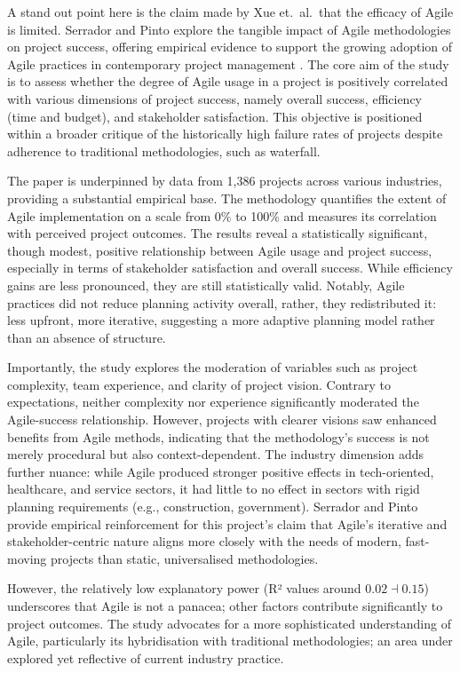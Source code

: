 \documentclass{report}
\begin{document}
A stand out point here is the claim made by Xue et.\ al.\ that the efficacy of Agile is limited. 
Serrador and Pinto explore the tangible impact of Agile methodologies on project success, offering empirical evidence to support the growing adoption of Agile practices in contemporary project management \parencite{serradorDoesAgileWork2015}. 
The core aim of the study is to assess whether the degree of Agile usage in a project is positively correlated with various dimensions of project success, namely overall success, efficiency (time and budget), and stakeholder satisfaction. 
This objective is positioned within a broader critique of the historically high failure rates of projects despite adherence to traditional methodologies, such as waterfall.

The paper is underpinned by data from 1,386 projects across various industries, providing a substantial empirical base. 
The methodology quantifies the extent of Agile implementation on a scale from 0\% to 100\% and measures its correlation with perceived project outcomes. 
The results reveal a statistically significant, though modest, positive relationship between Agile usage and project success, especially in terms of stakeholder satisfaction and overall success. 
While efficiency gains are less pronounced, they are still statistically valid. Notably, Agile practices did not reduce planning activity overall, rather, they redistributed it: less upfront, more iterative, suggesting a more adaptive planning model rather than an absence of structure.

Importantly, the study explores the moderation of variables such as project complexity, team experience, and clarity of project vision. 
Contrary to expectations, neither complexity nor experience significantly moderated the Agile-success relationship. 
However, projects with clearer visions saw enhanced benefits from Agile methods, indicating that the methodology's success is not merely procedural but also context-dependent. 
The industry dimension adds further nuance: while Agile produced stronger positive effects in tech-oriented, healthcare, and service sectors, it had little to no effect in sectors with rigid planning requirements (e.g., construction, government). 
Serrador and Pinto provide empirical reinforcement for this project's claim that Agile's iterative and stakeholder-centric nature aligns more closely with the needs of modern, fast-moving projects than static, universalised methodologies.

However, the relatively low explanatory power (R² values around $0.02\dashv 0.15$) underscores that Agile is not a panacea; other factors contribute significantly to project outcomes.
The study advocates for a more sophisticated understanding of Agile, particularly its hybridisation with traditional methodologies; an area under explored yet reflective of current industry practice.
\end{document}

